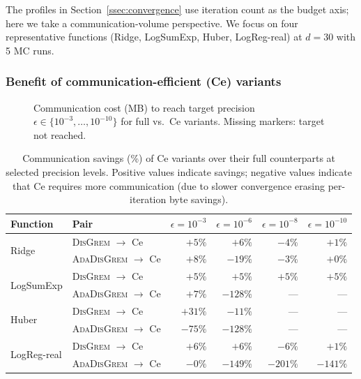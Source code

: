 \documentclass[review,onefignum,onetabnum]{siamart171218}
\begin{document}
	The profiles in Section~\ref{ssec:convergence} use iteration count
	as the budget axis; here we take a communication-volume perspective.
	We focus on four representative functions (Ridge, LogSumExp, Huber,
	LogReg-real) at $d=30$ with 5 MC runs.
	
	\subsubsection{Benefit of communication-efficient (Ce) variants}
	
	\begin{figure}[htbp]
		\centering
		\caption{Communication cost (MB) to reach target precision
			$\epsilon\in\{10^{-3},\ldots,10^{-10}\}$ for full vs.\ Ce variants.
			Missing markers: target not reached.}
		\label{fig:ce_benefit}
	\end{figure}
	
	\begin{table}[htbp]
		\centering
		\caption{Communication savings (\%) of Ce variants over their full
			counterparts at selected precision levels.
			Positive values indicate savings; negative values indicate that
			Ce requires more communication (due to slower convergence
			erasing per-iteration byte savings).}
		\label{tab:ce_savings}
		\setlength{\tabcolsep}{5pt}
		\small
		\begin{tabular}{llrrrr}
			\toprule
			Function & Pair & $\epsilon{=}10^{-3}$ & $\epsilon{=}10^{-6}$ & $\epsilon{=}10^{-8}$ & $\epsilon{=}10^{-10}$ \\
			\midrule
			\multirow{2}{*}{Ridge}
		& \textsc{DisGrem} $\to$ Ce       & $+5\%$  & $+6\%$   & $-4\%$  & $+1\%$  \\
		& \textsc{AdaDisGrem} $\to$ Ce    & $+8\%$  & $-19\%$  & $-3\%$  & $+0\%$  \\
		\midrule
		\multirow{2}{*}{LogSumExp}
		& \textsc{DisGrem} $\to$ Ce       & $+5\%$  & $+5\%$   & $+5\%$  & $+5\%$  \\
		& \textsc{AdaDisGrem} $\to$ Ce    & $+7\%$  & $-128\%$ & ---     & ---     \\
		\midrule
		\multirow{2}{*}{Huber}
		& \textsc{DisGrem} $\to$ Ce       & $+31\%$ & $-11\%$  & ---     & ---     \\
		& \textsc{AdaDisGrem} $\to$ Ce    & $-75\%$ & $-128\%$ & ---     & ---     \\
		\midrule
		\multirow{2}{*}{LogReg-real}
		& \textsc{DisGrem} $\to$ Ce       & $+6\%$  & $+6\%$   & $-6\%$  & $+1\%$  \\
		& \textsc{AdaDisGrem} $\to$ Ce    & $-0\%$  & $-149\%$ & $-201\%$ & $-141\%$ \\
			\bottomrule
		\end{tabular}
	\end{table}
	
\end{document}
